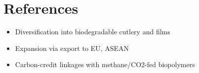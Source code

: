 \section{References}
\begin{itemize}
    \item Diversification into biodegradable cutlery and films
    \item Expansion via export to EU, ASEAN
    \item Carbon-credit linkages with methane/CO2-fed biopolymers
\end{itemize}